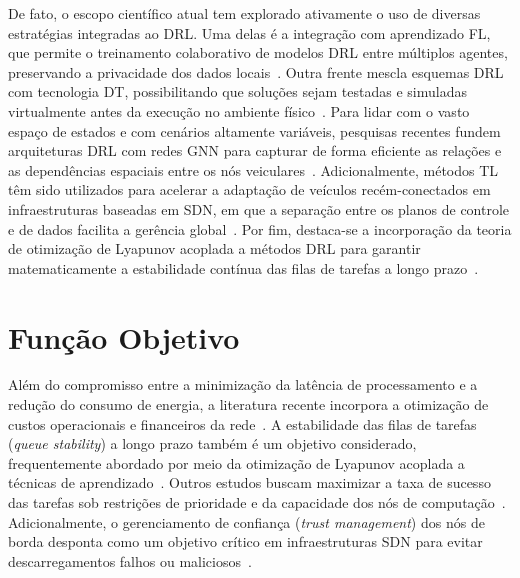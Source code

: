 De fato, o escopo científico atual tem explorado ativamente o uso de diversas estratégias  integradas ao \gls{DRL}. Uma delas é a integração com aprendizado \gls{FL}, que permite o treinamento colaborativo de modelos \gls{DRL} entre múltiplos agentes, preservando a privacidade dos dados locais~\cite{chen2025}. Outra frente mescla esquemas \gls{DRL} com tecnologia \gls{DT}, possibilitando que soluções sejam testadas e simuladas virtualmente antes da execução no ambiente físico~\cite{wei2024}. Para lidar com o vasto espaço de estados e com cenários altamente variáveis, pesquisas recentes fundem arquiteturas \gls{DRL} com redes \gls{GNN} para capturar de forma eficiente as relações e as dependências espaciais entre os nós veiculares~\cite{wang2024, tang2024}. Adicionalmente, métodos \gls{TL} têm sido utilizados para acelerar a adaptação de veículos recém-conectados em infraestruturas baseadas em \gls{SDN}, em que a separação entre os planos de controle e de dados facilita a gerência global~\cite{baker2024}. Por fim, destaca-se a incorporação da teoria de otimização de Lyapunov acoplada a métodos \gls{DRL} para garantir matematicamente a estabilidade contínua das filas de tarefas a longo prazo~\cite{kumar2023}.

\section*{Função Objetivo}
Além do compromisso entre a minimização da latência de processamento e a redução do consumo de energia, a literatura recente incorpora a otimização de custos operacionais e financeiros da rede~\cite{ma2025}. A estabilidade das filas de tarefas (\textit{queue stability}) a longo prazo também é um objetivo considerado, frequentemente abordado por meio da otimização de Lyapunov acoplada a técnicas de aprendizado~\cite{kumar2023}. Outros estudos buscam maximizar a taxa de sucesso das tarefas sob restrições de prioridade e da capacidade dos nós de computação~\cite{kumari2025}. Adicionalmente, o gerenciamento de confiança (\textit{trust management}) dos nós de borda desponta como um objetivo crítico em infraestruturas \gls{SDN} para evitar descarregamentos falhos ou maliciosos~\cite{baker2024}.

